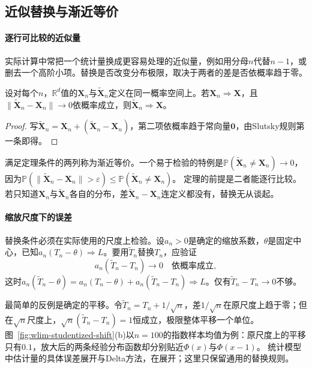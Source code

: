 \subsection{近似替换与渐近等价}

\paragraph{逐行可比较的近似量}
实际计算中常把一个统计量换成更容易处理的近似量，例如用分母$n$代替$n-1$，或删去一个高阶小项。替换是否改变分布极限，取决于两者的差是否依概率趋于零。

\begin{theorem}[近似替换]
\label{thm:wlim-approximation}
设对每个$n$，$\mathbb R^d$值的$\bm X_n$与$\widetilde{\bm X}_n$定义在同一概率空间上。若$\bm X_n\Rightarrow\bm X$，且$\lVert\widetilde{\bm X}_n-\bm X_n\rVert\to0$依概率成立，则$\widetilde{\bm X}_n\Rightarrow\bm X$。
\end{theorem}

\begin{proof}
写$\widetilde{\bm X}_n=\bm X_n+(\widetilde{\bm X}_n-\bm X_n)$，第二项依概率趋于常向量$\bm 0$，由Slutsky规则第一条即得。
\end{proof}

满足定理条件的两列称为渐近等价。一个易于检验的特例是$\mathbb P(\widetilde{\bm X}_n\neq\bm X_n)\to0$，因为$\mathbb P(\lVert\widetilde{\bm X}_n-\bm X_n\rVert>\varepsilon)\leq\mathbb P(\widetilde{\bm X}_n\neq\bm X_n)$。
定理的前提是二者能逐行比较。若只知道$\bm X_n$与$\widetilde{\bm X}_n$各自的分布，差$\widetilde{\bm X}_n-\bm X_n$连定义都没有，替换无从谈起。

\paragraph{缩放尺度下的误差}
替换条件必须在实际使用的尺度上检验。设$a_n>0$是确定的缩放系数，$\theta$是固定中心，已知$a_n(T_n-\theta)\Rightarrow L$。要用$\widetilde T_n$替换$T_n$，应验证
\[
  a_n(\widetilde T_n-T_n)\to0\quad\text{依概率成立},
\]
这时$a_n(\widetilde T_n-\theta)=a_n(T_n-\theta)+a_n(\widetilde T_n-T_n)\Rightarrow L$。仅有$\widetilde T_n-T_n\to0$不够。

最简单的反例是确定的平移。令$\widetilde T_n=T_n+1/\sqrt n$，差$1/\sqrt n$在原尺度上趋于零；但在$\sqrt n$尺度上，$\sqrt n(\widetilde T_n-T_n)=1$恒成立，极限整体平移一个单位。
图~\ref{fig:wlim-studentized-shift}(b)以$n=100$的指数样本均值为例：原尺度上的平移只有$0.1$，放大后的两条经验分布函数却分别贴近$\Phi(x)$与$\Phi(x-1)$。
统计模型中估计量的具体误差展开与Delta方法，在展开；这里只保留通用的替换规则。

